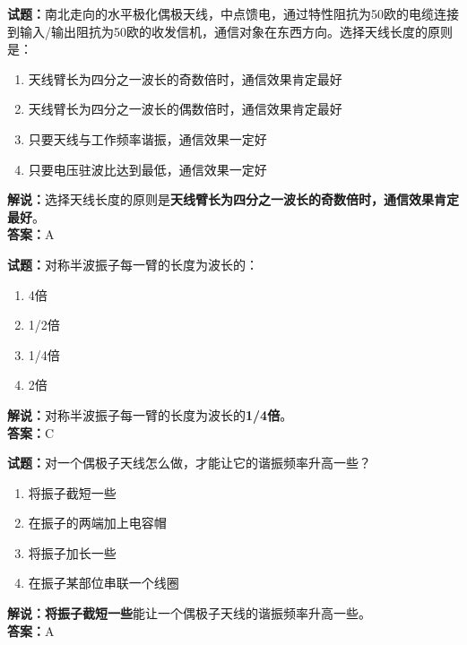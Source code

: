 \documentclass{ctexbook}
\begin{document}
\vspace{1em}

\textbf{试题：}南北走向的水平极化偶极天线，中点馈电，通过特性阻抗为50欧的电缆连接到输入/输出阻抗为50欧的收发信机，通信对象在东西方向。选择天线长度的原则是：
\begin{enumerate}[leftmargin=3em]
  \item 天线臂长为四分之一波长的奇数倍时，通信效果肯定最好
  \item 天线臂长为四分之一波长的偶数倍时，通信效果肯定最好
  \item 只要天线与工作频率谐振，通信效果一定好
  \item 只要电压驻波比达到最低，通信效果一定好
\end{enumerate}
\noindent\textbf{解说：}选择天线长度的原则是\textbf{天线臂长为四分之一波长的奇数倍时，通信效果肯定最好}。\\\noindent\textbf{答案：}A

\vspace{1em}

\textbf{试题：}对称半波振子每一臂的长度为波长的：
\begin{enumerate}[leftmargin=3em]
  \item 4倍
  \item 1/2倍
  \item 1/4倍
  \item 2倍
\end{enumerate}
\noindent\textbf{解说：}对称半波振子每一臂的长度为波长的\textbf{1/4倍}。\\\noindent\textbf{答案：}C

\vspace{1em}

\textbf{试题：}对一个偶极子天线怎么做，才能让它的谐振频率升高一些？
\begin{enumerate}[leftmargin=3em]
  \item 将振子截短一些
  \item 在振子的两端加上电容帽
  \item 将振子加长一些
  \item 在振子某部位串联一个线圈
\end{enumerate}
\noindent\textbf{解说：}\textbf{将振子截短一些}能让一个偶极子天线的谐振频率升高一些。\\\noindent\textbf{答案：}A

\vspace{1em}
\end{document}
